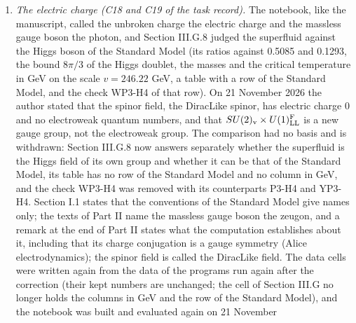 \documentclass[
  10pt,
]{article}
\begin{document}
\begin{enumerate}
  \(ZZ\), not that of the sum over the polarizations. It was found on 21
  November 2026, when the numbers typed in the drafts of the article for
  Physical Review D were compared with the data; the same sentence stood
  in Section 14.6 of the manuscript and in the addendum A2 of
  \texttt{provenance/P4\_remarks.md}, which were corrected first.
  Section III.G.8 now explains the corrections at tree level, with the
  factor as a formula, and a new input cell (\texttt{gzVV}) computes for
  every method the larger ratio of the masses, the smaller factor and
  how much the masses of the effective Lagrangian exceed those of the
  linear response. The cell makes no check: its numbers come from the
  values of the Rust program that the checks WP3-H1 to WP3-H3 have
  already compared with the notebook's own.
\item
  \emph{The electric charge (C18 and C19 of the task record).} The
  notebook, like the manuscript, called the unbroken charge the electric
  charge and the massless gauge boson the photon, and Section III.G.8
  judged the superfluid against the Higgs boson of the Standard Model
  (its ratios against 0.5085 and 0.1293, the bound \(8\pi/3\) of the
  Higgs doublet, the masses and the critical temperature in GeV on the
  scale \(v=246.22\) GeV, a table with a row of the Standard Model, and
  the check WP3-H4 of that row). On 21 November 2026 the author stated
  that the spinor field, the DiracLike spinor, has electric charge 0 and
  no electroweak quantum numbers, and that
  \(SU(2)_{\rm v}\times U(1)^{\rm F}_{\rm LL}\) is a new gauge group,
  not the electroweak group. The comparison had no basis and is
  withdrawn: Section III.G.8 now answers separately whether the
  superfluid is the Higgs field of its own group and whether it can be
  that of the Standard Model, its table has no row of the Standard Model
  and no column in GeV, and the check WP3-H4 was removed with its
  counterparts P3-H4 and YP3-H4. Section I.1 states that the conventions
  of the Standard Model give names only; the texts of Part II name the
  massless gauge boson the zeugon, and a remark at the end of Part II
  states what the computation establishes about it, including that its
  charge conjugation is a gauge symmetry (Alice electrodynamics); the
  spinor field is called the DiracLike field. The data cells were
  written again from the data of the programs run again after the
  correction (their kept numbers are unchanged; the cell of Section
  III.G no longer holds the columns in GeV and the row of the Standard
  Model), and the notebook was built and evaluated again on 21 November

\end{enumerate}
\end{document}
